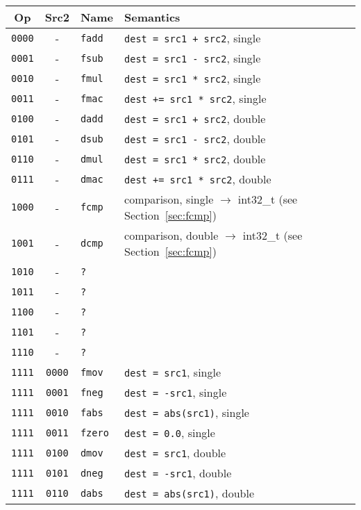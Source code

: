 \documentclass[10pt,DIV12]{scrartcl}
\begin{document}
\begin{tabular}{ccll}
\toprule
Op & Src2 & Name & Semantics \\
\midrule
\texttt{0000} & - & \texttt{fadd} & \texttt{dest = src1 + src2}, single \\
\texttt{0001} & - & \texttt{fsub} & \texttt{dest = src1 - src2}, single \\
\texttt{0010} & - & \texttt{fmul} & \texttt{dest = src1 * src2}, single \\
\texttt{0011} & - & \texttt{fmac} & \texttt{dest += src1 * src2}, single \\
\texttt{0100} & - & \texttt{dadd} & \texttt{dest = src1 + src2}, double \\
\texttt{0101} & - & \texttt{dsub} & \texttt{dest = src1 - src2}, double \\
\texttt{0110} & - & \texttt{dmul} & \texttt{dest = src1 * src2}, double \\
\texttt{0111} & - & \texttt{dmac} & \texttt{dest += src1 * src2}, double \\
\texttt{1000} & - & \texttt{fcmp} & comparison, single $\rightarrow$ int32\_t (see Section~\ref{sec:fcmp}) \\
\texttt{1001} & - & \texttt{dcmp} & comparison, double $\rightarrow$ int32\_t (see Section~\ref{sec:fcmp}) \\
\texttt{1010} & - & \texttt{?} & \\
\texttt{1011} & - & \texttt{?} & \\
\texttt{1100} & - & \texttt{?} & \\
\texttt{1101} & - & \texttt{?} & \\
\texttt{1110} & - & \texttt{?} & \\
\texttt{1111} & \texttt{0000} & \texttt{fmov} & \texttt{dest = src1}, single \\
\texttt{1111} & \texttt{0001} & \texttt{fneg} & \texttt{dest = -src1}, single \\
\texttt{1111} & \texttt{0010} & \texttt{fabs} & \texttt{dest = abs(src1)}, single \\
\texttt{1111} & \texttt{0011} & \texttt{fzero} & \texttt{dest = 0.0}, single \\
\texttt{1111} & \texttt{0100} & \texttt{dmov} & \texttt{dest = src1}, double \\
\texttt{1111} & \texttt{0101} & \texttt{dneg} & \texttt{dest = -src1}, double \\
\texttt{1111} & \texttt{0110} & \texttt{dabs} & \texttt{dest = abs(src1)}, double \\

\end{tabular}
\end{document}
